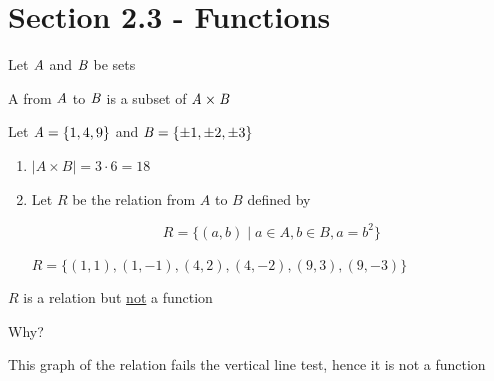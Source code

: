 \documentclass[../../Main.tex]{subfiles}
\begin{document}
\section{Section 2.3 - Functions}

\begin{definition}
    Let $\mathit{A}$ and $\mathit{B}$ be sets

    A  from $\mathit{A}$ to $\mathit{B}$ is a subset of $\mathit{A} \times \mathit{B}$
\end{definition}

\begin{example}
    Let $\mathit{A} = \{ 1, 4, 9 \}$ and $\mathit{B} = \{ \pm 1, \pm 2, \pm 3 \}$

    \begin{enumerate}
        \item $| A \times B | = 3 \cdot 6 = 18 $
        \item Let $R$ be the relation from $A$ to $B$ defined by
        
        $$R = \{ (a, b) \mid a \in A, b \in B, a = b^2 \}$$

        $R = \{ (1, 1), (1, -1), (4, 2), (4, -2), (9, 3), (9, -3) \}$
    \end{enumerate}

\end{example}

\begin{note}
    $R$ is a relation but \underline{not} a function
\end{note}

Why?


This graph of the relation fails the vertical line test, hence it is not a function
\end{document}
